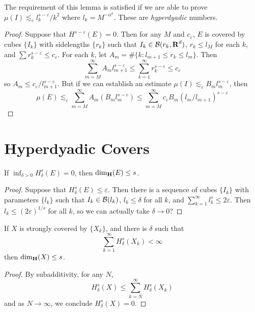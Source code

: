 The requirement of this lemma is satisfied if we are able to prove $\mu(I) \lesssim_\varepsilon l_k^{s - \varepsilon}/k^2$ where $l_k = M^{- \alpha^k}$. These are \emph{hyperdyadic} numbers.

\begin{proof}
	Suppose that $H^{s-\varepsilon}(E) = 0$. Then for any $M$ and $c_\varepsilon$, $E$ is covered by cubes $\{ I_k \}$ with sidelengths $\{ r_k \}$ such that $I_k \in \operatorname{\mathcal{B}}(r_k,\operatorname{\mathbf{R}}^d)$, $r_k \leq l_M$ for each $k$, and $\sum r_k^{s - \varepsilon} \leq c_\varepsilon$. For each $k$, let $A_m = \# \{ k: l_{m+1} \leq r_k \leq l_m \}$. Then
	\[ \sum_{m = M}^\infty A_m l_{m+1}^{s - \varepsilon} \leq \sum_{k = 1}^\infty r_k^{s - \varepsilon} \leq c_\varepsilon \]
	so $A_m \leq c_\varepsilon / l_{m+1}^{s-\varepsilon}$. But if we can establish an estimate $\mu(I) \lesssim_\varepsilon B_m l_m^{s - \varepsilon}$, then 
	\[ \mu(E) \lesssim_\varepsilon \sum_{m = M}^\infty A_m (B_m l_m^{s - \varepsilon}) \leq \sum_{m = M}^\infty c_\varepsilon B_m (l_m/l_{m+1})^{s - \varepsilon} \]
\end{proof}

\section{Hyperdyadic Covers}

\begin{theorem}
	If $\inf_{\delta > 0} H^s_\delta(E) = 0$, then $\operatorname{\dim_{\mathbf{H}}}(E) \leq s$.
\end{theorem}
\begin{proof}
	Suppose that $H^s_\delta(E) \leq \varepsilon$. Then there is a sequence of cubes $\{ I_k \}$ with parameters $\{ l_k \}$ such that $I_k \in \operatorname{\mathcal{B}}(l_k)$, $l_k \leq \delta$ for all $k$, and $\sum_{k = 1}^\infty l_k^s \leq 2\varepsilon$. Then $l_k \leq (2\varepsilon)^{1/s}$ for all $k$, so we can actually take $\delta \to 0$?
\end{proof}

\begin{theorem}
	If $X$ is strongly covered by $\{ X_k \}$, and there is $\delta$ such that
	\[ \sum_{k = 1}^\infty H^s_\delta(X_k) < \infty \]
	then $\operatorname{\dim_{\mathbf{H}}}(X) \leq s$.
\end{theorem}
\begin{proof}
	By subadditivity, for any $N$,
	\[ H^s_\delta(X) \leq \sum_{k = N}^\infty H^s_\delta(X_k) \]
	and as $N \to \infty$, we conclude $H^s_\delta(X) = 0$.
\end{proof}


